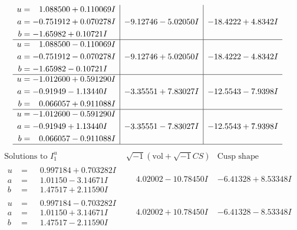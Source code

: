 \documentclass[1p]{elsarticle_modified}
\theoremstyle{definition}
\newcommand{\I}{\sqrt{-1}}
\begin{document}
$$\begin{array}{c|c|c}
\begin{aligned}
u &= \phantom{-}1.088500 + 0.110069 I \\
a &= -0.751912 + 0.070278 I \\
b &= -1.65982 + 0.10721 I\end{aligned}
 & -9.12746 - 5.02050 I & -18.4222 + 4.8342 I \\ \hline\begin{aligned}
u &= \phantom{-}1.088500 - 0.110069 I \\
a &= -0.751912 - 0.070278 I \\
b &= -1.65982 - 0.10721 I\end{aligned}
 & -9.12746 + 5.02050 I & -18.4222 - 4.8342 I \\ \hline\begin{aligned}
u &= -1.012600 + 0.591290 I \\
a &= -0.91949 - 1.13440 I \\
b &= \phantom{-}0.066057 + 0.911088 I\end{aligned}
 & -3.35551 + 7.83027 I & -12.5543 - 7.9398 I \\ \hline\begin{aligned}
u &= -1.012600 - 0.591290 I \\
a &= -0.91949 + 1.13440 I \\
b &= \phantom{-}0.066057 - 0.911088 I\end{aligned}
 & -3.35551 - 7.83027 I & -12.5543 + 7.9398 I\\
 \hline 
 \end{array}$$\newpage$$\begin{array}{c|c|c}  
\text{Solutions to }I^u_{1}& \I (\text{vol} + \sqrt{-1}CS) & \text{Cusp shape}\\
 \hline 
\begin{aligned}
u &= \phantom{-}0.997184 + 0.703282 I \\
a &= \phantom{-}1.01150 - 3.14671 I \\
b &= \phantom{-}1.47517 + 2.11590 I\end{aligned}
 & \phantom{-}4.02002 - 10.78450 I & -6.41328 + 8.53348 I \\ \hline\begin{aligned}
u &= \phantom{-}0.997184 - 0.703282 I \\
a &= \phantom{-}1.01150 + 3.14671 I \\
b &= \phantom{-}1.47517 - 2.11590 I\end{aligned}
 & \phantom{-}4.02002 + 10.78450 I & -6.41328 - 8.53348 I \\ \hline\begin{aligned}

\end{aligned}
\end{array}$$
\end{document}
